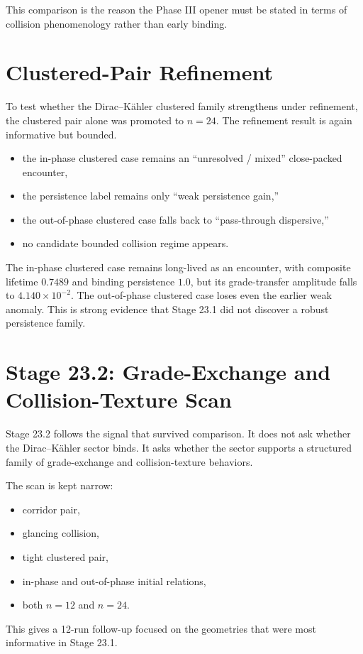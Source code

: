 \documentclass[11pt]{article}
\begin{document}
This comparison is the reason the Phase III opener must be stated in terms of collision phenomenology rather than early binding.

\section{Clustered-Pair Refinement}

To test whether the Dirac--K\"ahler clustered family strengthens under refinement, the clustered pair alone was promoted to $n=24$. The refinement result is again informative but bounded.
\begin{itemize}
\item the in-phase clustered case remains an ``unresolved / mixed'' close-packed encounter,
\item the persistence label remains only ``weak persistence gain,''
\item the out-of-phase clustered case falls back to ``pass-through dispersive,''
\item no candidate bounded collision regime appears.
\end{itemize}

The in-phase clustered case remains long-lived as an encounter, with composite lifetime $0.7489$ and binding persistence $1.0$, but its grade-transfer amplitude falls to $4.140\times10^{-2}$. The out-of-phase clustered case loses even the earlier weak anomaly. This is strong evidence that Stage 23.1 did not discover a robust persistence family.

\section{Stage 23.2: Grade-Exchange and Collision-Texture Scan}

Stage 23.2 follows the signal that survived comparison. It does not ask whether the Dirac--K\"ahler sector binds. It asks whether the sector supports a structured family of grade-exchange and collision-texture behaviors.

The scan is kept narrow:
\begin{itemize}
\item corridor pair,
\item glancing collision,
\item tight clustered pair,
\item in-phase and out-of-phase initial relations,
\item both $n=12$ and $n=24$.
\end{itemize}
This gives a 12-run follow-up focused on the geometries that were most informative in Stage 23.1.
\end{document}
